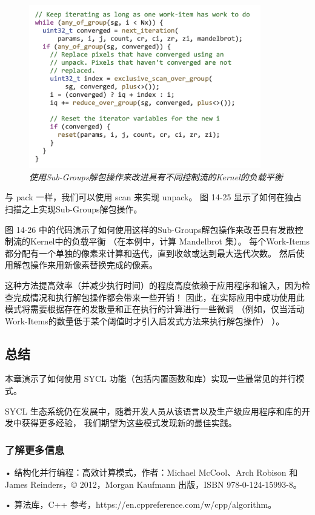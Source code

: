 \begin{figure}[H]
	\centering
	\includegraphics[width=0.9\textwidth]{figs/F14.26.png}
	\caption{\textit{使用Sub-Groups解包操作来改进具有不同控制流的Kernel的负载平衡 }}
\end{figure}

与 pack 一样，我们可以使用 scan 来实现 unpack。 图 14-25 显示了如何在独占扫描之上实现Sub-Groups解包操作。

图 14-26 中的代码演示了如何使用这样的Sub-Groups解包操作来改善具有发散控制流的Kernel中的负载平衡
（在本例中，计算 Mandelbrot 集）。 每个Work-Items都分配有一个单独的像素来计算和迭代，直到收敛或达到最大迭代次数。 
然后使用解包操作来用新像素替换完成的像素。

这种方法提高效率（并减少执行时间）的程度高度依赖于应用程序和输入，因为检查完成情况和执行解包操作都会带来一些开销！ 
因此，在实际应用中成功使用此模式将需要根据存在的发散量和正在执行的计算进行一些微调
（例如，仅当活动Work-Items的数量低于某个阈值时才引入启发式方法来执行解包操作） ）。

\subsection{总结}
本章演示了如何使用 SYCL 功能（包括内置函数和库）实现一些最常见的并行模式。

SYCL 生态系统仍在发展中，随着开发人员从该语言以及生产级应用程序和库的开发中获得更多经验，
我们期望为这些模式发现新的最佳实践。

\subsubsection{了解更多信息}
• 结构化并行编程：高效计算模式，作者：Michael McCool、Arch Robison 
和 James Reinders，© 2012，Morgan Kaufmann 出版，ISBN 978-0-124-15993-8。

• 算法库，C++ 参考，https://en.cppreference.com/w/cpp/algorithm。